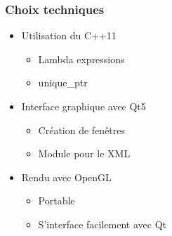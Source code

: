 \documentclass{beamer}
\begin{document}
\begin{frame}
\frametitle{Choix techniques}
\begin{itemize}[label=$\bullet$]
	\item Utilisation du C++11
	\begin{itemize}[label=$\circ$]
		\item Lambda expressions
        \item unique\_ptr 
	\end{itemize}
	\item Interface graphique avec Qt5
	\begin{itemize}[label=$\circ$]
		\item Création de fenêtres
        \item Module pour le XML
	\end{itemize}
	\item Rendu avec OpenGL
          \begin{itemize}[label=$\circ$]
		\item Portable
        \item S'interface facilement avec Qt
	\end{itemize}
\end{itemize}

\end{frame}

\end{document}

